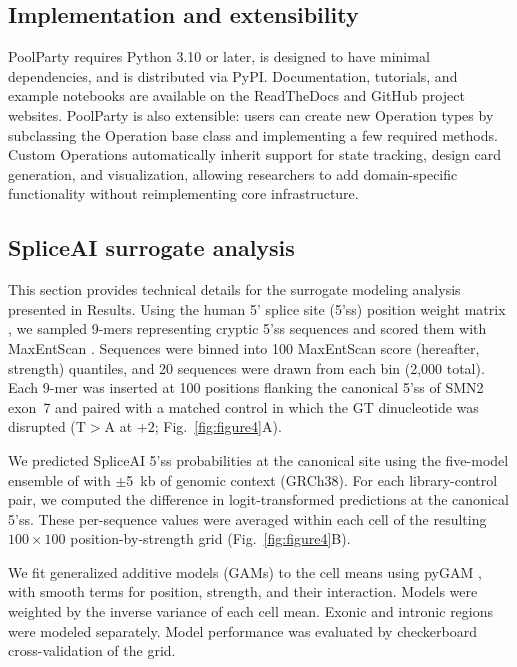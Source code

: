 \documentclass[twoside]{kinneylab_preprintstyle}
\begin{document}
\subsection{Implementation and extensibility}

PoolParty requires Python 3.10 or later, is designed to have minimal dependencies, and is distributed via PyPI. Documentation, tutorials, and example notebooks are available on the ReadTheDocs and GitHub project websites. PoolParty is also extensible: users can create new Operation types by subclassing the Operation base class and implementing a few required methods. Custom Operations automatically inherit support for state tracking, design card generation, and visualization, allowing researchers to add domain-specific functionality without reimplementing core infrastructure.

\subsection{SpliceAI surrogate analysis}

This section provides technical details for the surrogate modeling analysis presented in Results. Using the human 5' splice site (5'ss) position weight matrix \citep{Wong2018quantitative}, we sampled 9-mers representing cryptic 5'ss sequences and scored them with MaxEntScan \citep{Yeo2004me}. Sequences were binned into 100 MaxEntScan score (hereafter, strength) quantiles, and 20 sequences were drawn from each bin (2,000 total). Each 9-mer was inserted at 100 positions flanking the canonical 5'ss of SMN2 exon~7 and paired with a matched control in which the GT dinucleotide was disrupted (T$>$A at $+2$; Fig.~\ref{fig:figure4}A).

We predicted SpliceAI 5'ss probabilities at the canonical site using the five-model ensemble of \citet{Jaganathan2019ps} with $\pm$5~kb of genomic context (GRCh38). For each library-control pair, we computed the difference in logit-transformed predictions at the canonical 5'ss. These per-sequence values were averaged within each cell of the resulting $100 \times 100$ position-by-strength grid (Fig.~\ref{fig:figure4}B).

We fit generalized additive models (GAMs) to the cell means using pyGAM \citep{Serven2018pg}, with smooth terms for position, strength, and their interaction. Models were weighted by the inverse variance of each cell mean. Exonic and intronic regions were modeled separately. Model performance was evaluated by checkerboard cross-validation of the grid.
\end{document}
